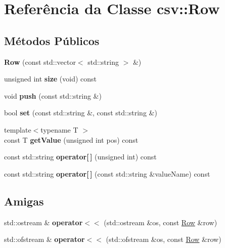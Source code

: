 \hypertarget{classcsv_1_1Row}{}\section{Referência da Classe csv\+:\+:Row}
\label{classcsv_1_1Row}
\subsection*{Métodos Públicos}
\begin{DoxyCompactItemize}
\item 
\mbox{\label{classcsv_1_1Row_ae8eafed936af5e605d46c5dbc2e50218}} 
{\bfseries Row} (const std\+::vector$<$ std\+::string $>$ \&)
\item 
\mbox{\label{classcsv_1_1Row_ace79ec6779c708e4cb39470d3bb9f61d}} 
unsigned int {\bfseries size} (void) const
\item 
\mbox{\label{classcsv_1_1Row_a657608d3d8fc04b17253a503f23afd73}} 
void {\bfseries push} (const std\+::string \&)
\item 
\mbox{\label{classcsv_1_1Row_a79fd93afb3b7e74f807e1e0484515e13}} 
bool {\bfseries set} (const std\+::string \&, const std\+::string \&)
\item 
\mbox{\label{classcsv_1_1Row_ab300d0b96a07657c5ca5ae33a1160e1a}} 
{\footnotesize template$<$typename T $>$ }\\const T {\bfseries get\+Value} (unsigned int pos) const
\item 
\mbox{\label{classcsv_1_1Row_af9e4a37e5f6e63ebeaf6c153d6ae8afe}} 
const std\+::string {\bfseries operator\mbox{[}$\,$\mbox{]}} (unsigned int) const
\item 
\mbox{\label{classcsv_1_1Row_af3fa9f8447d6d70fd148dcf87d866d66}} 
const std\+::string {\bfseries operator\mbox{[}$\,$\mbox{]}} (const std\+::string \&value\+Name) const
\end{DoxyCompactItemize}
\subsection*{Amigas}
\begin{DoxyCompactItemize}
\item 
\mbox{\label{classcsv_1_1Row_ad07b377993b0af211415f60c91ea351a}} 
std\+::ostream \& {\bfseries operator$<$$<$} (std\+::ostream \&os, const \hyperlink{classcsv_1_1Row}{Row} \&row)
\item 
\mbox{\label{classcsv_1_1Row_a3b0a724d6cee076c9beb79ad893acb55}} 
std\+::ofstream \& {\bfseries operator$<$$<$} (std\+::ofstream \&os, const \hyperlink{classcsv_1_1Row}{Row} \&row)
\end{DoxyCompactItemize}


